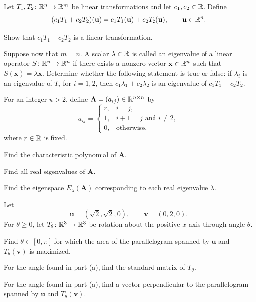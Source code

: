\begin{problem}
Let $T_1,T_2\colon\mathbb{R}^n\to\mathbb{R}^m$ be linear transformations and let $c_1,c_2\in\mathbb{R}$. Define
\[
(c_1T_1+c_2T_2)(\mathbf u)=c_1T_1(\mathbf u)+c_2T_2(\mathbf u),
\qquad \mathbf u\in\mathbb{R}^n.
\]
\begin{problemsubparts}
\item Show that $c_1T_1+c_2T_2$ is a linear transformation.
\item Suppose now that $m=n$. A scalar $\lambda\in\mathbb{R}$ is called an eigenvalue of a linear operator $S\colon\mathbb{R}^n\to\mathbb{R}^n$ if there exists a nonzero vector $\mathbf x\in\mathbb{R}^n$ such that $S(\mathbf x)=\lambda\mathbf x$. Determine whether the following statement is true or false: if $\lambda_i$ is an eigenvalue of $T_i$ for $i=1,2$, then $c_1\lambda_1+c_2\lambda_2$ is an eigenvalue of $c_1T_1+c_2T_2$.
\end{problemsubparts}
\end{problem}

\begin{problem}
For an integer $n>2$, define $\mathbf A=(a_{ij})\in\mathbb{R}^{n\times n}$ by
\[
a_{ij}=
\begin{cases}
r,&i=j,\\
1,&i+1=j\text{ and }i\ne2,\\
0,&\text{otherwise},
\end{cases}
\]
where $r\in\mathbb{R}$ is fixed.
\begin{problemsubparts}
\item Find the characteristic polynomial of $\mathbf A$.
\item Find all real eigenvalues of $\mathbf A$.
\item Find the eigenspace $E_\lambda(\mathbf A)$ corresponding to each real eigenvalue $\lambda$.
\end{problemsubparts}
\end{problem}

\begin{problem}
Let
\[
\mathbf u=(\sqrt2,\sqrt2,0),
\qquad
\mathbf v=(0,2,0).
\]
For $\theta\ge0$, let $T_\theta\colon\mathbb{R}^3\to\mathbb{R}^3$ be rotation about the positive $x$-axis through angle $\theta$.
\begin{problemsubparts}
\item Find $\theta\in[0,\pi]$ for which the area of the parallelogram spanned by $\mathbf u$ and $T_\theta(\mathbf v)$ is maximized.
\item For the angle found in part \textup{(a)}, find the standard matrix of $T_\theta$.
\item For the angle found in part \textup{(a)}, find a vector perpendicular to the parallelogram spanned by $\mathbf u$ and $T_\theta(\mathbf v)$.
\end{problemsubparts}
\end{problem}

